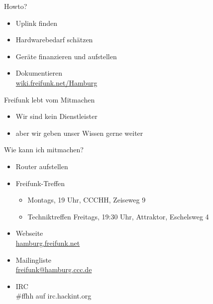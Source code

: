 \documentclass[t]{beamer}
\begin{document}
  
  \begin{frame}{Howto?}
    \begin{itemize}
      \item Uplink finden
      \item Hardwarebedarf schätzen
      \item Geräte finanzieren und aufstellen
      \item Dokumentieren\\
      \small{ \href{https://wiki.freifunk.net/Hamburg}{wiki.freifunk.net/Hamburg}}
    \end{itemize}
  \end{frame}
  
  \begin{frame}{Freifunk lebt vom Mitmachen}
    \begin{itemize}
      \item Wir sind kein Dienstleister
      \item aber wir geben unser Wissen gerne weiter
    \end{itemize}
  \end{frame}
  
  \begin{frame}{Wie kann ich mitmachen?}
    \begin{itemize}
      \item Router aufstellen
      \item Freifunk-Treffen
      \begin{itemize}
       \item Montags, 19 Uhr, CCCHH, Zeiseweg 9
       \item Techniktreffen Freitags, 19:30 Uhr, Attraktor, Eschelsweg 4
      \end{itemize}
      \item Webseite\\
      \href{https://hamburg.freifunk.net}{\small hamburg.freifunk.net}
      \item Mailingliste\\
      \href{mailto:freifunk@hamburg.ccc.de}{\small freifunk@hamburg.ccc.de}
      \item IRC\\
      \small{\#ffhh auf irc.hackint.org}
    \end{itemize}
  \end{frame}
  
\end{document}
